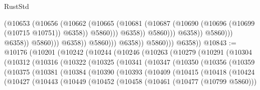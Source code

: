 \begin{lexlean}{RustStd}
\begin{coremodule}
                                                    (@10653
                                                      (@10656
                                                        (@10662
                                                          (@10665
                                                            (@10681
                                                              (@10687
                                                                (@10690
                                                                  (@10696
                                                                    (@10699 (@10715 @10751))
                                                                    @6358))
                                                                @5860)))
                                                          @6358))
                                                      @5860)))
                                                @6358))
                                            @5860)))
                                      @6358))
                                  @5860)))
                            @6358))
                        @5860)))
                  @6358))
              @5860)))
        @6358))
@10843 := @10176
    (@10201
      (@10242
        (@10244
          (@10246
            (@10263
              (@10279
                (@10291
                  (@10304
                    (@10312
                      (@10316
                        (@10322
                          (@10325
                            (@10341
                              (@10347
                                (@10350
                                  (@10356
                                    (@10359
                                      (@10375
                                        (@10381
                                          (@10384
                                            (@10390
                                              (@10393
                                                (@10409
                                                  (@10415
                                                    (@10418
                                                      (@10424
                                                        (@10427
                                                          (@10443
                                                            (@10449
                                                              (@10452
                                                                (@10458
                                                                  (@10461 (@10477 (@10799 @5860)))

\end{coremodule}
\end{lexlean}
